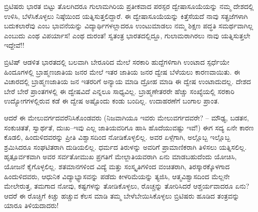 ಬ್ರಿಟಿಷರು ಭಾರತ ಬಿಟ್ಟು ತೊಲಗಿದರೂ ಗುಲಾಮಗಿರಿಯ ಪ್ರತೀಕವಾದ ಪರಸ್ಪರ ದ್ವೇಷಾ\-ಸೂಯೆಯನ್ನು ನಮ್ಮ ದೇಶದಲ್ಲಿ ಉಳಿಸಿ, ಬೆಳೆಸಿಕೊಳ್ಳಲು ನಿಷ್ಠೆಯಿಂದ ಯತ್ನಿಸುತ್ತಲಿದ್ದಾರೆ. ಈ ದ್ವೇಷಾಸೂಯೆಯನ್ನು ಕಿತ್ತೆಸೆಯದೆ ನಾವು ಸತ್ಪ್ರಜೆಗಳಾಗಿ ಬದುಕಲಾರೆವು ಎಂಬ ಭಾವನೆಯನ್ನು ವಿದ್ಯಾರ್ಥಿಗಳಲ್ಲಾದರೂ ಉಂಟುಮಾಡಲು ನಮ್ಮ ಶಿಕ್ಷಣ ಪದ್ಧತಿ ಸಮರ್ಥವಾಗಿಲ್ಲ ಎಂಬುದು ಎಂಥ ವಿಪರ್ಯಾಸ! ಎಂಥ ದುರಂತ! ಸ್ವತಂತ್ರ ಭಾರತದಲ್ಲಿದ್ದೂ, ಗುಲಾಮರಾಗಿರಲು ನಾವು ಯತ್ನಿಸುತ್ತಲೇ ಇದ್ದೇವೆ!!

\newpage

ಬ್ರಿಟಿಷ್ ಆಡಳಿತ ಭಾರತದಲ್ಲಿ ಬಲವಾಗಿ ಬೇರೂರಿದ ಮೇಲೆ ಸರಕಾರಿ ಹುದ್ದೆಗಳಿಗಾಗಿ ಉಂಟಾದ ಸ್ಪರ್ಧೆಯೇ ಹಿಂದೂಗಳಲ್ಲಿ ಬ್ರಾಹ್ಮಣಜಾತಿಯ ಜನರ ಮೇಲೆ ಇತರ ಜಾತಿಯ ಜನರ ದ್ವೇಷ ಬೆಳೆಯಲು ಕಾರಣವಾಯಿತು. ಈ ವಿಚಾರದಲ್ಲಿ ಬ್ರಾಹ್ಮಣಜಾತಿಯ ಜನ ಇತರರಿಗೆ ಅನ್ಯಾಯ ಮಾಡಿ ದ್ರೋಹ ಮಾಡಿ ಈ ದ್ವೇಷ ಉಂಟಾದುದಲ್ಲ. ದೇಶದ ಬೇರೆ ಬೇರೆ ಪ್ರಾಂತಗಳಲ್ಲಿ ಈ ದ್ವೇಷವಿದೆ ಎನ್ನಲೂ ಸಾಧ್ಯವಿಲ್ಲ. ಬ್ರಾಹ್ಮಣೇತರರೇ ಹೆಚ್ಚು ಸಂಖ್ಯೆಯಲ್ಲಿ ಸರಕಾರಿ ಉದ್ಯೋಗಗಳಲ್ಲಿರುವ ಕಡೆ ಈ ದ್ವೇಷ ಅಷ್ಟೊಂದು ಕಂಡು ಬಂದಿಲ್ಲ. ಉದಾಹರಣೆಗೆ ಬಂಗಾಲ ಪ್ರಾಂತ.

ಆದರೆ ಈ ಮೇಲುವರ್ಗದವರೆನಿಸಿಕೊಂಡವರು (ನಿಜವಾಗಿಯೂ ಇವರು ಮೇಲು\-ವರ್ಗ\-ದವರೇ? – ಮೌಢ್ಯ, ಬಡತನ, ಸಂಕುಚಿತತೆ, ಸ್ವಾರ್ಥತೆ, ದುಃಖ–ಇವು ಎಲ್ಲ ಜಾತಿಯವರಿಗೂ ಹಾಸಿ ಹೊದೆಯುವಷ್ಟು ಇವೆ!) ಈಗ ಸದ್ಯ ಏನೇ ಕಾರಣ ಕೊಡಲಿ, ಹಿಂದುಳಿದವರನ್ನು ಪ್ರೀತಿ ವಿಶ್ವಾಸದಿಂದ ನೋಡಿಕೊಳ್ಳಲಿಲ್ಲ. ಅವರ ಏಳ್ಗೆಗಾಗಿ, ಅಲ್ಲೊಬ್ಬ ಇಲ್ಲೊಬ್ಬ ಶ್ರಮಿಸಿದರೂ ಸಂಘಟಿತರಾಗಿ ದುಡಿಯಲಿಲ್ಲ. ಧರ್ಮದ ತಿರುಳನ್ನು ಅವರಿಗೆ ಪ್ರಾಮಾಣಿಕರಾಗಿ ತಿಳಿಸಲು ಯತ್ನಿಸಲಿಲ್ಲ. ಹೃತ್ಪೂರ್ವಕವಾಗಿ ಅವರ ಸರ್ವತೋಮುಖ ಪ್ರಗತಿಗೆ ಮೇಲ್ಜಾತಿಯವರಾಗಿ ಏನು ಮಾಡಬಹುದೆಂದು ಯೋಚಿಸಿ, ಯೋಜನೆ ಕೈಗೊಳ್ಳಲಿಲ್ಲ. ಶತಮಾನಗಳಿಂದ ವಿದ್ಯೆ ಮತ್ತು ಸಂಸ್ಕೃತಿಗಳಿಂದ ವಂಚಿತರಾಗಿ, ತಿರಸ್ಕಾರಕ್ಕೊಳಗಾದ ಹಿಂದುಳಿದವರು, ಆಧುನಿಕ ವಿದ್ಯಾಭ್ಯಾಸವನ್ನು ಪಡೆದು ಕೀಳರಿಮೆಯನ್ನು ತ್ಯಜಿಸಿ, ಆತ್ಮವಿಶ್ವಾಸದಿಂದ ಮೆಲ್ಲನೇ ಮೇಲೇರುತ್ತ, ತಮಗಾದ ನೋವು, ಕಷ್ಟಗಳನ್ನು ತೋಡಿಕೊಳ್ಳಲು, ರೊಚ್ಚನ್ನು ತೋರಿಸಿದರೆ ಆಶ್ಚರ್ಯವಾದರೂ ಏನು? ಆದರೆ ಈ ರೊಚ್ಚಿಗೆ ಕಿಚ್ಚು ಹಚ್ಚುವ ಕೆಲಸ ಮಾಡಿ ತಮ್ಮ ಬೇಳೆಬೇಯಿಸಿಕೊಳ್ಳಲು ಬ್ರಿಟಿಷರು ಹೂಡಿದ ತಂತ್ರವನ್ನು ಯಾರೂ ತಿಳಿಯದಾದರು!


